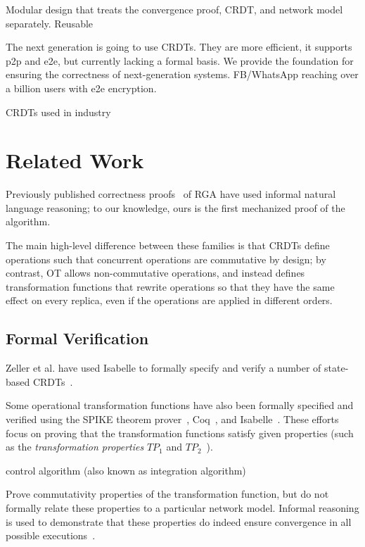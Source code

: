 \documentclass[11pt]{article}
\begin{document}
Modular design that treats the convergence proof, CRDT, and network model separately. Reusable

The next generation is going to use CRDTs. They are more efficient, it supports p2p and e2e, but currently lacking a formal
basis. We provide the foundation for ensuring the correctness of next-generation systems.
FB/WhatsApp reaching over a billion users with e2e encryption.

CRDTs used in industry


\section{Related Work}
\label{sect.relatedwork}

Previously published correctness proofs~\cite{Attiya:2016kh,Kleppmann:2016ve,Roh:2009ws} of RGA have
used informal natural language reasoning; to our knowledge, ours is the first mechanized proof of
the algorithm.

The main high-level difference between these families is that CRDTs define operations such that
concurrent operations are commutative by design; by contrast, OT allows non-commutative operations,
and instead defines transformation functions that rewrite operations so that they have the same
effect on every replica, even if the operations are applied in different orders.

\subsection{Formal Verification}

Zeller et al. have used Isabelle to formally specify and verify a number of state-based CRDTs~\cite{Zeller:2014fl}.

Some operational transformation functions have also been formally specified and verified using the
SPIKE theorem prover~\cite{Imine:2003ks,Imine:2006kn}, Coq~\cite{Sinchuk:2016cf}, and
Isabelle~\cite{Jungnickel:2015ua}. These efforts focus on proving that the transformation functions
satisfy given properties (such as the \emph{transformation properties} $\mathit{TP}_1$ and
$\mathit{TP}_2$~\cite{Oster:2006tr,Ressel:1996wx}).

control algorithm (also known as integration algorithm)

Prove commutativity properties of the transformation function, but do not formally relate these
properties to a particular network model. Informal reasoning is used to demonstrate that these
properties do indeed ensure convergence in all possible
executions~\cite{Suleiman:1998eu,Sun:1998vf}.
\end{document}
